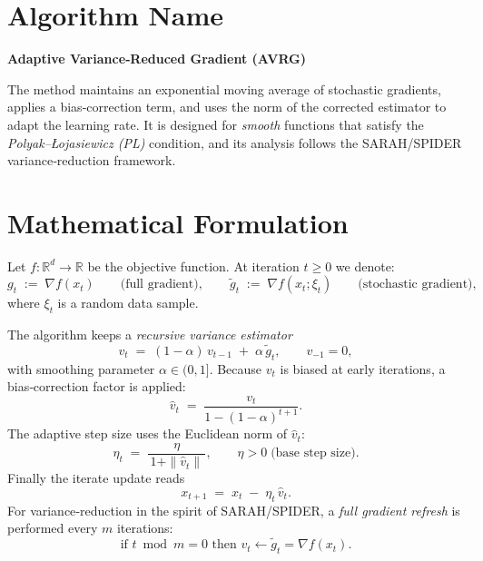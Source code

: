 \documentclass{article}
\begin{document}
\section*{Algorithm Name}
\textbf{Adaptive Variance‑Reduced Gradient (AVRG)}  

The method maintains an exponential moving average of stochastic gradients,
applies a bias‑correction term, and uses the norm of the corrected estimator
to adapt the learning rate.  It is designed for \emph{smooth} functions that
satisfy the \emph{Polyak–Łojasiewicz (PL)} condition, and its analysis follows
the SARAH/SPIDER variance‑reduction framework.

\section*{Mathematical Formulation}
Let $f:\mathbb{R}^d\rightarrow\mathbb{R}$ be the objective function.
At iteration $t\ge 0$ we denote:
\[
g_t \;:=\; \nabla f(x_t)                         \qquad\text{(full gradient)},
\qquad
\tilde g_t \;:=\; \nabla f(x_t;\xi_t)            \qquad\text{(stochastic gradient)},
\]
where $\xi_t$ is a random data sample.  

The algorithm keeps a \emph{recursive variance estimator}
\begin{equation}
v_t \;=\;(1-\alpha)\,v_{t-1}\;+\;\alpha\,\tilde g_t,
\qquad v_{-1}=0,
\label{eq:vt}
\end{equation}
with smoothing parameter $\alpha\in(0,1]$.
Because $v_t$ is biased at early iterations, a bias‑correction factor is
applied:
\begin{equation}
\hat v_t \;=\;\frac{v_t}{1-(1-\alpha)^{t+1}} .
\label{eq:hatvt}
\end{equation}
The adaptive step size uses the Euclidean norm of $\hat v_t$:
\begin{equation}
\eta_t \;=\;\frac{\eta}{\,1+\|\hat v_t\|\,},
\qquad \eta>0\;\text{(base step size)} .
\label{eq:etat}
\end{equation}
Finally the iterate update reads
\begin{equation}
x_{t+1}\;=\;x_t\;-\;\eta_t\,\hat v_t .
\label{eq:update}
\end{equation}
For variance‑reduction in the spirit of SARAH/SPIDER, a \emph{full gradient
refresh} is performed every $m$ iterations:
\[
\text{if }t\bmod m =0\text{ then }v_t\gets \tilde g_t = \nabla f(x_t).
\]
\end{document}
